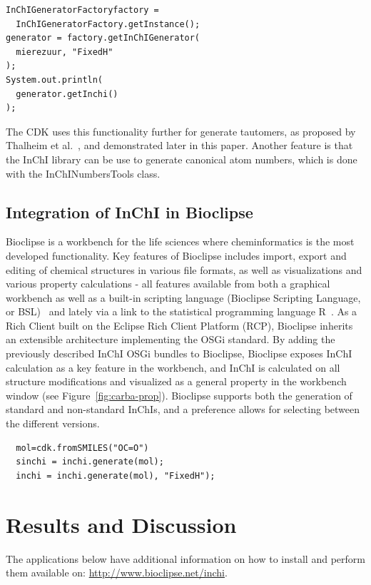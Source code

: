 \documentclass[10pt]{bmc_article}
\newenvironment{bmcformat}{\fussy\setboolean{publ}{true}}{\fussy}
\begin{document}
\begin{bmcformat}
\begin{verbatim}
InChIGeneratorFactoryfactory =
  InChIGeneratorFactory.getInstance();
generator = factory.getInChIGenerator(
  mierezuur, "FixedH"
);
System.out.println(
  generator.getInchi()
);
\end{verbatim}

The CDK uses this functionality further for generate tautomers, as proposed by Thalheim et al.~\cite{Thalheim2010},
and demonstrated later in this paper. Another feature is that the InChI library can be use to generate canonical
atom numbers, which is done with the InChINumbersTools class.


\subsection*{Integration of InChI in Bioclipse}
Bioclipse is a workbench for the life sciences where cheminformatics is the most developed functionality. Key features of Bioclipse includes import, export and editing of chemical structures in various file formats, as well as visualizations and various property calculations - all features available from both a graphical workbench as well as a built-in scripting language (Bioclipse Scripting Language, or BSL)~\cite{Spjuth:2009ly,Spjuth:2012fk} and lately via a link to the statistical programming language R~\cite{Spjuth:2013uq}. As a Rich Client built on the Eclipse Rich Client Platform (RCP), Bioclipse inherits an extensible architecture implementing the OSGi standard. By adding the previously described InChI OSGi bundles to Bioclipse, Bioclipse exposes InChI calculation as a key feature in the workbench, and InChI is calculated on all structure modifications and visualized as a general property in the workbench window (see Figure~\ref{fig:carba-prop}). Bioclipse supports both the generation of standard and non-standard InChIs, and a preference allows for selecting between the different versions.

\begin{verbatim}
  mol=cdk.fromSMILES("OC=O")
  sinchi = inchi.generate(mol);
  inchi = inchi.generate(mol), "FixedH");
\end{verbatim}


\section*{Results and Discussion}
The applications below have additional information on how to install and perform them available on: \url{http://www.bioclipse.net/inchi}.


\end{bmcformat}
\end{document}
